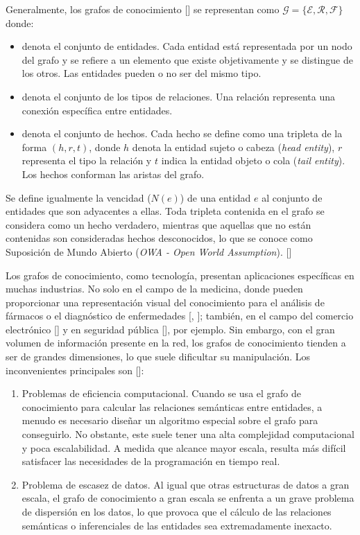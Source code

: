 Generalmente, los grafos de conocimiento [\cite{survey}] se representan como $\mathcal{G} = \lbrace \mathcal{E}, \mathcal{R}, \mathcal{F} \rbrace$ donde:
\begin{itemize}
    \item {} denota el conjunto de entidades. Cada entidad está representada por un nodo del grafo y se refiere a un elemento que existe objetivamente y se distingue de los otros. Las entidades pueden o no ser del mismo tipo.
    \item {} denota el conjunto de los tipos de relaciones. Una relación representa una conexión específica entre entidades.
    \item {} denota el conjunto de hechos. Cada hecho se define como una tripleta de la forma $(h, r, t)$, donde $h$ denota la entidad sujeto o cabeza (\textit{head entity}), $r$ representa el tipo la relación y $t$ indica la entidad objeto o cola (\textit{tail entity}). Los hechos conforman las aristas del grafo.
\end{itemize}

Se define igualmente la vencidad ($N(e)$) de una entidad $e$ al conjunto de entidades que son adyacentes a ellas. Toda tripleta contenida en el grafo se considera como un hecho verdadero, mientras que aquellas que no están contenidas son consideradas hechos desconocidos, lo que se conoce como Suposición de Mundo Abierto (\textit{OWA - Open World Assumption}). [\cite{taskdriven}]

Los grafos de conocimiento, como tecnología, presentan aplicaciones específicas en muchas industrias. No solo en el campo de la medicina, donde pueden proporcionar una representación visual del conocimiento para el análisis de fármacos o el diagnóstico de enfermedades [\cite{sang}, \cite{abdel}]; también, en el campo del comercio electrónico [\cite{commerce}] y en seguridad pública [\cite{security}], por ejemplo. Sin embargo, con el gran volumen de información presente en la red, los grafos de conocimiento tienden a ser de grandes dimensiones, lo que suele dificultar su manipulación. Los inconvenientes principales son [\cite{dai}]:

\begin{enumerate}[label=(\roman*)]
    \item Problemas de eficiencia computacional. Cuando se usa el grafo de conocimiento para calcular las relaciones semánticas entre entidades, a menudo es necesario diseñar un algoritmo especial sobre el grafo para conseguirlo. No obstante, este suele tener una alta complejidad computacional y poca escalabilidad. A medida que alcance mayor escala, resulta más difícil satisfacer las necesidades de la programación en tiempo real.
    \item Problema de escasez de datos. Al igual que otras estructuras de datos a gran escala, el grafo de conocimiento a gran escala se enfrenta a un grave problema de dispersión en los datos, lo que provoca que el cálculo de las relaciones semánticas o inferenciales de las entidades sea extremadamente inexacto.
\end{enumerate}
    
